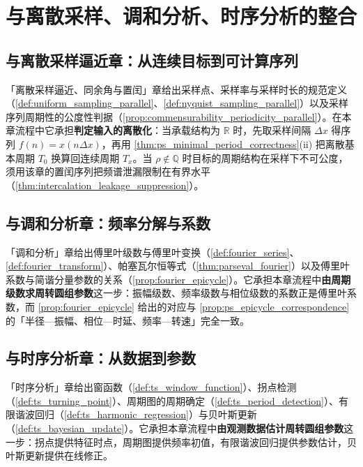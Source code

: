 \section{与离散采样、调和分析、时序分析的整合}\label{sec:ps_integration}

\subsection{与离散采样逼近章：从连续目标到可计算序列}

「离散采样逼近、同余角与置闰」章给出采样点、采样率与采样时长的规范定义（\cref{def:uniform_sampling_parallel}、\cref{def:nyquist_sampling_parallel}）以及采样序列周期性的公度性判据（\cref{prop:commensurability_periodicity_parallel}）。在本章流程中它承担\textbf{判定输入的离散化}：当承载结构为 $\mathbb{R}$ 时，先取采样间隔 $\Delta x$ 得序列 $f(n)=x(n\Delta x)$，再用 \cref{thm:ps_minimal_period_correctness}(ii) 把离散基本周期 $T_0$ 换算回连续周期 $T_x$。当 $\rho\notin\mathbb{Q}$ 时目标的周期结构在采样下不可公度，须用该章的置闰序列把频谱泄漏限制在有界水平（\cref{thm:intercalation_leakage_suppression}）。

\subsection{与调和分析章：频率分解与系数}

「调和分析」章给出傅里叶级数与傅里叶变换（\cref{def:fourier_series}、\cref{def:fourier_transform}）、帕塞瓦尔恒等式（\cref{thm:parseval_fourier}）以及傅里叶系数与简谐分量参数的关系（\cref{prop:fourier_epicycle}）。它承担本章流程中\textbf{由周期级数求周转圆组参数}这一步：振幅级数、频率级数与相位级数的系数正是傅里叶系数，而 \cref{prop:fourier_epicycle} 给出的对应与 \cref{prop:ps_epicycle_correspondence} 的「半径—振幅、相位—时延、频率—转速」完全一致。

\subsection{与时序分析章：从数据到参数}

「时序分析」章给出窗函数（\cref{def:ts_window_function}）、拐点检测（\cref{def:ts_turning_point}）、周期图的周期确定（\cref{def:ts_period_detection}）、有限谐波回归（\cref{def:ts_harmonic_regression}）与贝叶斯更新（\cref{def:ts_bayesian_update}）。它承担本章流程中\textbf{由观测数据估计周转圆组参数}这一步：拐点提供特征时点，周期图提供频率初值，有限谐波回归提供参数估计，贝叶斯更新提供在线修正。

